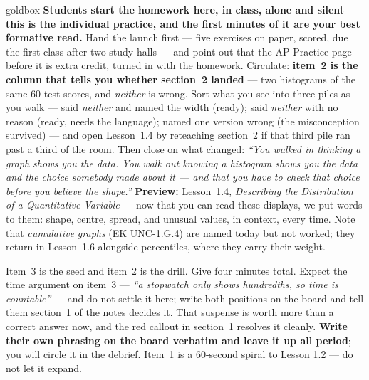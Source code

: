 \documentclass[10pt]{article}
\begin{document}
\boxguard
\begin{skillbox}{goldbox}
\textbf{Students start the homework here, in class, alone and silent --- this is the individual
practice, and the first minutes of it are your best formative read.} Hand the launch first ---
five exercises on paper, scored, due the first class after two study halls --- and point
out that the AP Practice page before it is extra credit, turned in with the homework. Circulate:
\textbf{item~2 is the column that tells you whether section~2 landed} --- two histograms of the
same 60 test scores, and \emph{neither} is wrong. Sort what you see into three piles as you walk
--- said \emph{neither} and named the width (ready); said \emph{neither} with no reason (ready,
needs the language); named one version wrong (the misconception survived) --- and open
Lesson~1.4 by reteaching section~2 if that third pile ran past a third of the room. Then close
on what changed: \emph{``You walked in thinking a graph shows you the data. You walk out knowing a
histogram shows you the data \emph{and} the choice somebody made about it --- and that you have
to check that choice before you believe the shape.''} \textbf{Preview:} Lesson~1.4,
\emph{Describing the Distribution of a Quantitative Variable} --- now that you can read these
displays, we put words to them: shape, centre, spread, and unusual values, in context, every
time. Note that \emph{cumulative graphs} (EK UNC-1.G.4) are named today but not worked; they
return in Lesson~1.6 alongside percentiles, where they carry their weight.
\end{skillbox}

\begin{teachernote}[Warm-Up]
Item~3 is the seed and item~2 is the drill. Give four minutes total. Expect the time argument on
item~3 --- \emph{``a stopwatch only shows hundredths, so time is countable''} --- and do not
settle it here; write both positions on the board and tell them section~1 of the notes decides
it. That suspense is worth more than a correct answer now, and the red callout in section~1
resolves it cleanly. \textbf{Write their own phrasing on the board verbatim and leave it up all
period}; you will circle it in the debrief. Item~1 is a 60-second spiral to Lesson 1.2 --- do not
let it expand.
\end{teachernote}
\end{document}
